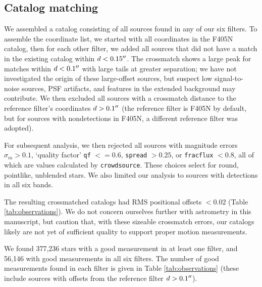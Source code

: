 \documentclass[times,astrosymb,twocolumn]{aastex631}
\newcommand\nstarstotal{377,236\xspace}
\newcommand\nstarsallgood{56,146\xspace}
\def\rr#1{#1}
\begin{document}
\subsection{Catalog matching}
\label{sec:catalogxmatch}
We assemble\rr{d} a catalog consisting of all sources found in any of our six filters.
To assemble the coordinate list, we start\rr{ed} with all coordinates in the F405N catalog, then for each other filter, we add\rr{ed} all sources that \rr{did} not have a match in the existing catalog within $d<0.15\mbox{$^{\prime\prime}$}$.
The crossmatch shows a large peak for matches within $d<0.1\mbox{$^{\prime\prime}$}$ with large tails at greater separation\rr{; we have not investigated the origin of these large-offset sources, but suspect low signal-to-noise sources, PSF artifacts, and features in the extended background may contribute}.
\rr{We then excluded all sources with a crossmatch distance to the reference filter's coordinates $d>0.1\mbox{$^{\prime\prime}$}$ (the reference filter is F405N by default, but for sources with nondetections in F405N, a different reference filter was adopted).}

For subsequent analysis, we then reject\rr{ed} all sources with magnitude errors $\sigma_m > 0.1$, `quality factor' \texttt{qf} $<=0.6$, \texttt{spread} $>0.25$, or \texttt{fracflux} $<0.8$\rr{, all of which are values calculated by \texttt{crowdsource}}.
These choices select for round, pointlike, unblended stars.
\rr{We also limit\rr{ed} our analysis to sources with detections in all six bands.}

The resulting crossmatched catalogs had RMS positional offsets $<0.02$ \arcsec (Table \ref{tab:observations}). 
We do not concern ourselves further with astrometry in this manuscript, but caution that\rr{, with these sizeable crossmatch errors,} our catalogs likely are not yet of sufficient quality to support proper motion measurements.

We \rr{found} \nstarstotal stars with a good measurement in at least one filter, and \nstarsallgood with good measurements in all \rr{six} filters.
The number \rr{of good measurements} found in each filter is given in Table \ref{tab:observations} (these include sources with offsets from the reference filter $d>0.1\mbox{$^{\prime\prime}$}$).
\end{document}
